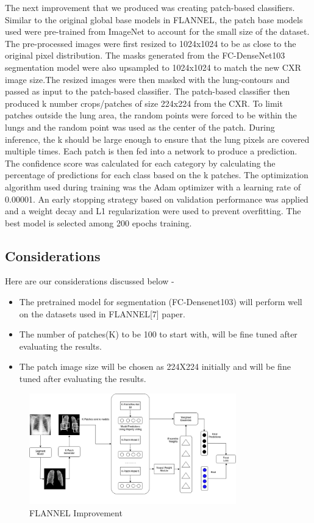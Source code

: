 \documentclass{sigkddExp}
\begin{document}
The next improvement that we produced was creating patch-based classifiers.
Similar to the original global base models in FLANNEL, the patch base models
used were pre-trained from ImageNet to account for the small size of the
dataset. The pre-processed images were first resized to 1024x1024 to be as close
to the original pixel distribution. The masks generated from the FC-DenseNet103
segmentation model were also upsampled to 1024x1024 to match the new CXR image
size.The resized images were then masked with the lung-contours and passed as
input to the patch-based classifier. The patch-based classifier then produced k
number crops/patches of size 224x224 from the CXR. To limit patches outside the
lung area, the random points were forced to be within the lungs and the random
point was used as the center of the patch. During inference, the k should be
large enough to ensure that the lung pixels are covered multiple times. Each
patch is then fed into a network to produce a prediction. The confidence score
was calculated for each category by calculating the percentage of predictions
for each class based on the k patches. The optimization algorithm used during
training was the Adam optimizer with a learning rate of 0.00001. An early
stopping strategy based on validation performance was applied and a weight decay
and L1 regularization were used to prevent overfitting. The best model is
selected among 200 epochs training.

\subsection{Considerations}
Here are our considerations discussed below -
\begin{itemize}
    \item The pretrained model for segmentation (FC-Densenet103) will perform
          well on the datasets used in FLANNEL[7] paper.
    \item The number of patches(K) to be 100 to start with, will be fine tuned
          after evaluating the results.
    \item The patch image size will be chosen as 224X224 initially and will be
          fine tuned after evaluating the results.
\end{itemize}


\begin{figure}[h]
    \includegraphics[width=0.8\textwidth]{../doc/images/FLANNEL-IMPROVED.png}
    \caption{FLANNEL Improvement}
    \label{fig:improve}
\end{figure}
\end{document}
